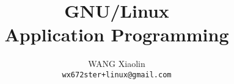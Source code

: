 \usepackage{wx672tut}



\newcommand{\textbooks}{\nocite{cs241, matthew2008beginning, cooper10bash, raymond2003art,
    stevens2013advanced, Love:2007:LSP:1205435, Kerrisk:2010:LPI:1869911,
    Bryant2010computersystems}}%



\title{GNU/Linux\\Application Programming}
\author{WANG Xiaolin\\%
  {\footnotesize\texttt{wx672ster+linux@gmail.com}}}


